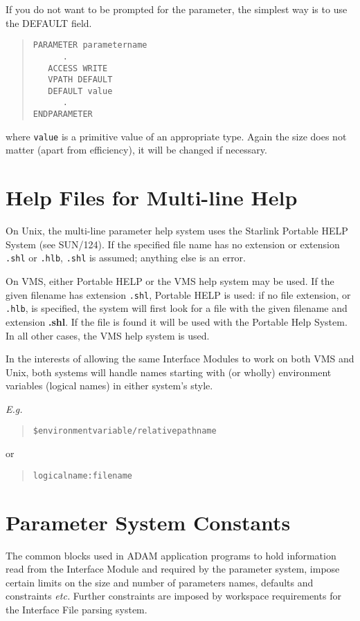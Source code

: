 \documentclass[twoside,11pt]{article}
\newcommand{\xref}[3]{#1}
\newcommand{\xlabel}[1]{}
\renewcommand{\_}{\texttt{\symbol{95}}}
\begin{document}
If you do not want to be prompted for the parameter, the simplest way is
to use the DEFAULT field.
\begin{quote} \begin{verbatim}
PARAMETER parametername
      .
   ACCESS WRITE
   VPATH DEFAULT
   DEFAULT value
      .
ENDPARAMETER
\end{verbatim} \end{quote}
where \texttt{value} is a primitive value of an appropriate type. Again the
size does not matter (apart from efficiency), it will be changed if 
necessary.

\newpage
\section{Help Files for Multi-line Help
\xlabel{help_files_for_multiline_help}\label{help}}

On Unix, the multi-line parameter help system uses the Starlink Portable HELP 
System (see \xref{SUN/124}{sun124}{}).
If the specified file name has no extension or extension
\texttt{.shl} or \texttt{.hlb}, \texttt{.shl} is assumed; anything else is an error.

On VMS, either Portable HELP or the VMS help system
may be used.
If the given filename has extension \texttt{.shl}, Portable HELP is used:
if no file extension, or \texttt{.hlb}, is specified,
the system will first look for a file with the given filename and extension 
{\bf .shl}.
If the file is found it will be used with the Portable Help System.
In all other cases, the VMS help system is used.

In the interests of allowing the same Interface Modules to work on both VMS
and Unix, both systems will handle names starting with (or wholly) environment 
variables (logical names) in either system's style.

{\em E.g.}  
\begin{quote}
\texttt{\$environment\_variable/relative\_pathname}\/
\end{quote}
or
\begin{quote}
\texttt{logical\_name:filename}
\end{quote}

\newpage
\section{Parameter System Constants\xlabel{parameter_system_constants}
\label{consts}}

The common blocks used in ADAM application programs to hold information read 
from the Interface Module and required by the parameter system, impose certain 
limits on the size and number of parameters names, defaults and constraints 
{\em etc.} Further constraints are imposed by workspace requirements for the
Interface File parsing system.
\end{document}
